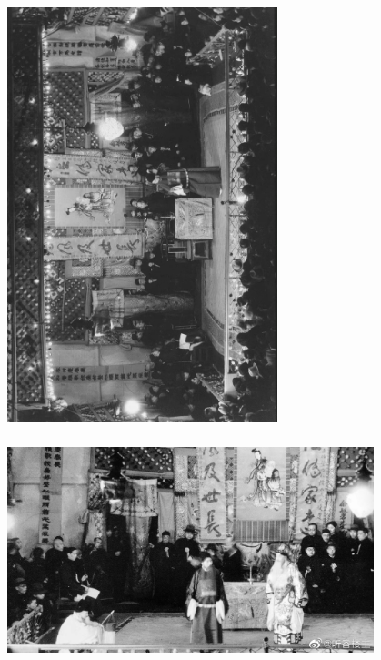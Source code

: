 \documentclass[cjk,slidestop,compress,mathserif,blue]{beamer}
\begin{document}
\frame
{
	\frametitle{}
\begin{figure}[h!]
\centering
\vspace{-0.20in}
\includegraphics[height=1.00\textwidth,width=0.70\textwidth, angle=270, clip]{Figures_Peking-Opera/PekOpe_His-3.jpg}
\label{History-3}
\end{figure}
}

\frame
{
	\frametitle{}
\begin{figure}[h!]
\centering
\vspace{-0.10in}
\includegraphics[height=0.60\textwidth,width=0.95\textwidth, clip]{Figures_Peking-Opera/PekOpe_His-4.jpg}
\label{History-4}
\end{figure}
}
\end{document}
